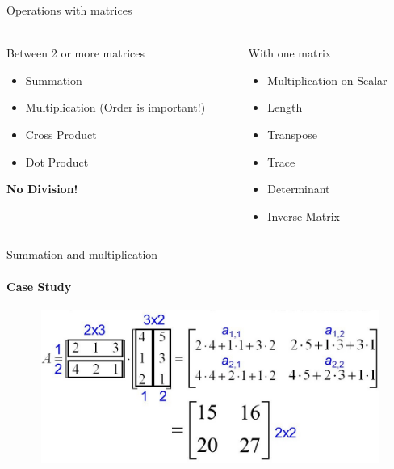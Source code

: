\documentclass[aspectratio=169,notes]{beamer}
\begin{document}
\begin{frame}[t]{Operations with matrices}
\framesubtitle{}
\begin{columns}[T,onlytextwidth]
    \begin{column}{0.45\textwidth}
        \begin{exampleblock}{Between 2 or more matrices}
            \begin{itemize}
                \item Summation
                \item Multiplication (Order is important!)
                \item Cross Product
                \item Dot Product
            \end{itemize}
        \end{exampleblock}
        \alert{\textbf{\Large No Division!}}
    \end{column}
    \begin{column}{0.45\textwidth}
        \begin{exampleblock}{With one matrix}
            \begin{itemize}
                \item Multiplication on Scalar
                \item Length
                \item Transpose
                \item Trace
                \item Determinant
                \item Inverse Matrix
            \end{itemize}
        \end{exampleblock}
    \end{column}
\end{columns}

\end{frame}

\begin{frame}[t]{Summation and multiplication}
\framesubtitle{Case Study}
    \begin{figure}[H]
        \centering\includegraphics[height=5cm,width=1\textwidth,keepaspectratio]{matrix_multi_case.jpg}
        \label{fig:matrix_multi_case.jpg}
    \end{figure}
\end{frame}
\end{document}
